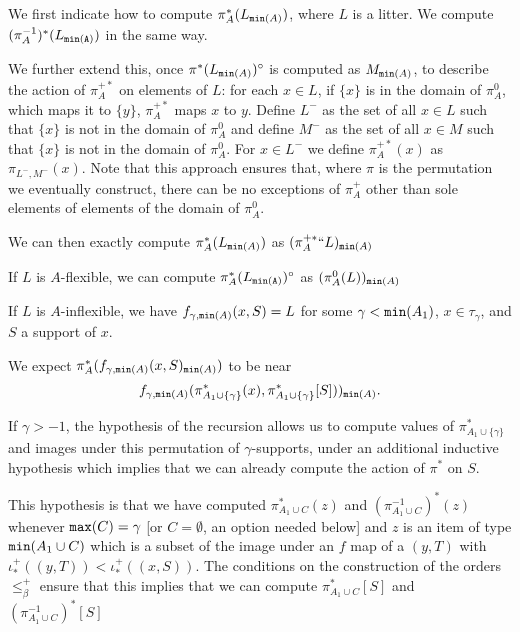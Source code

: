 \documentclass[112pt]{article}
\begin{document}
\begin{description}
We first indicate how to compute $\pi^*_A(L_{{\tt min}(A)})$, where $L$ is a litter.  We compute  $(\pi^{-1}_A)^*(L_{\tt min(A)})$ in the same way.

We further extend this, once $\pi^*(L_{{\tt min}(A)})^\circ$ is computed as $M_{{\tt min}(A)}$, to describe the action of $\pi^{+*}_A$ on elements of $L$:
for each $x \in L$, if $\{x\}$ is in the domain of $\pi^0_A$, which maps it to $\{y\}$, $\pi^{+*}_{A}$ maps $x$ to $y$.  Define $L^-$ as the set of all $x \in L$ such that
$\{x\}$ is not in the domain of $\pi^0_A$ and define $M^-$ as the set of all $x \in M$ such that
$\{x\}$ is not in the domain of $\pi^0_A$.  For $x \in L^-$ we define $\pi^{+*}_{A}(x)$ as $\pi_{L^-,M^-}(x)$.  Note that this approach ensures that, where $\pi$ is the permutation we eventually construct, there can be no exceptions of $\pi^+_A$ other than sole elements of elements of the domain of $\pi^0_A$.

We can then exactly compute $\pi^*_A(L_{{\tt min}(A)})$ as $(\pi^{+*}_A``L)_{{\tt min}(A)}$

If $L$ is $A$-flexible, we can compute $\pi^*_A(L_{\tt {\tt min}(A)})^\circ$ as $(\pi^0_A(L))_{{\tt min}(A)}$

If $L$ is $A$-inflexible, we have $f_{\gamma,{\tt min}(A)}(x,S) = L$ for some $\gamma<{\tt min}(A_1)$, $x \in \tau_\gamma$, and $S$ a support of $x$.

We expect $\pi^*_A(f_{\gamma,{\tt min}(A)}(x,S)_{{\tt min}(A)})$ to be near $$f_{ \gamma,{\tt min}(A)}(\pi^*_{A_1\cup \{\gamma\}}(x),\pi^*_{A_1\cup \{\gamma\}}[S]))_{{\tt min}(A)}.$$



If $\gamma>-1$, the hypothesis of the recursion allows us to compute values of $\pi^*_{A_1\cup \{\gamma\}}$ and images under this permutation of $\gamma$-supports,
under an additional inductive hypothesis which implies that we can already compute the action of $\pi^*$ on $S$.

This hypothesis is that  we have computed $\pi_{A_1 \cup C}^*(z)$ and $(\pi_{A_1 \cup C}^{-1})^*(z)$ whenever ${\tt max}(C)=\gamma$ [or $C = \emptyset$, an option needed below] and $z$ is an item of type ${\tt min}(A_1 \cup C)$ which is a subset
of the image under an $f$ map of a $(y,T)$ with $\iota^+_*((y,T)) < \iota^+_*((x,S))$.  The conditions on the construction of the orders
$\leq^+_\beta$ ensure that this implies that we can compute $\pi_{A_1 \cup C}^*[S]$ and $(\pi_{A_1 \cup C}^{-1})^*[S]$ 


\end{description}
\end{document}

